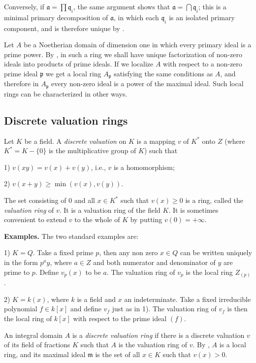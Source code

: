 Conversely, if \(\mathfrak a=\prod\mathfrak q_i\), the same argument shows that \(\mathfrak a=\bigcap\mathfrak q_i\); this is a minimal primary decomposition of \(\mathfrak a\), in which each \(\mathfrak q_i\) is an isolated primary component, and is therefore unique by . \proofbox

Let \(A\) be a Noetherian domain of dimension one in which every primary ideal is a prime power. By , in such a ring we shall have unique factorization of non-zero ideals into products of prime ideals. If we localize \(A\) with respect to a non-zero prime ideal \(\mathfrak p\) we get a local ring \(A_\mathfrak p\) satisfying the same conditions as \(A\), and therefore in \(A_\mathfrak p\) every non-zero ideal is a power of the maximal ideal. Such local rings can be characterized in other ways.

\subsection{Discrete valuation rings}

Let \(K\) be a field. A \emph{discrete valuation} on \(K\) is a mapping \(v\) of \(K^*\) onto \(Z\) (where \(K^*=K-\{0\}\) is the multiplicative group of \(K\)) such that

1) \(v(xy)=v(x)+v(y)\), i.e., \(v\) is a homomorphism;

2) \(v(x+y)\geq\min(v(x),v(y))\).

The set consisting of 0 and all \(x\in K^*\) such that \(v(x)\geq0\) is a ring, called the \emph{valuation ring} of \(v\). It is a valuation ring of the field \(K\). It is sometimes convenient to extend \(v\) to the whole of \(K\) by putting \(v(0)=+\infty\).

\noindent\textbf{Examples.} The two standard examples are:

1) \(K=Q\). Take a fixed prime \(p\), then any non zero \(x\in Q\) can be written uniquely in the form \(p^ay\), where \(a\in Z\) and both numerator and denominator of \(y\) are prime to \(p\). Define \(v_p(x)\) to be \(a\). The valuation ring of \(v_p\) is the local ring \(Z_{(p)}\).

2) \(K=k(x)\), where \(k\) is a field and \(x\) an indeterminate. Take a fixed irreducible polynomial \(f\in k[x]\) and define \(v_f\) just as in 1). The valuation ring of \(v_f\) is then the local ring of \(k[x]\) with respect to the prime ideal \((f)\).

An integral domain \(A\) is a \emph{discrete valuation ring} if there is a discrete valuation \(v\) of its field of fractions \(K\) such that \(A\) is the valuation ring of \(v\). By , \(A\) is a local ring, and its maximal ideal \(\mathfrak m\) is the set of all \(x\in K\) such that \(v(x)>0\).

